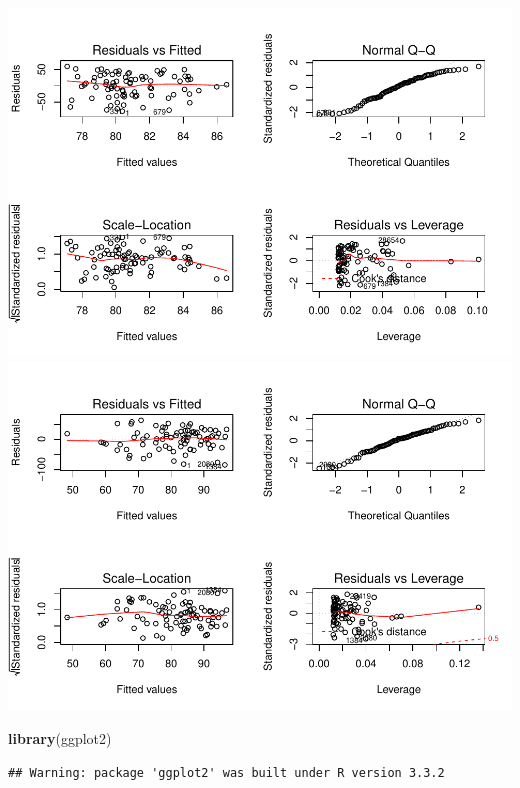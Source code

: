 \documentclass[]{article}
\newenvironment{Shaded}{\begin{snugshade}}{\end{snugshade}}
\newcommand{\KeywordTok}[1]{\textcolor[rgb]{0.13,0.29,0.53}{\textbf{{#1}}}}
\newcommand{\NormalTok}[1]{{#1}}
\begin{document}
\includegraphics{Desc_stats_files/figure-latex/unnamed-chunk-1-10.pdf}
\includegraphics{Desc_stats_files/figure-latex/unnamed-chunk-1-11.pdf}

\begin{Shaded}
\begin{Highlighting}[]
\KeywordTok{library}\NormalTok{(ggplot2)}
\end{Highlighting}
\end{Shaded}

\begin{verbatim}
## Warning: package 'ggplot2' was built under R version 3.3.2
\end{verbatim}
\end{document}
